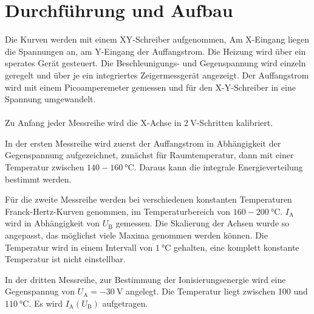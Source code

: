\section{Durchführung und Aufbau}
\label{sec:Aufbau}
Die Kurven werden mit einem XY-Schreiber aufgenommen,
Am X-Eingang liegen die Spannungen an, am Y-Eingang der Auffangstrom.
Die Heizung wird über ein sperates Gerät gesteuert.
Die Beschleunigungs- und Gegenspannung wird einzeln geregelt und über je ein
integriertes Zeigermessgerät angezeigt.
Der Auffangstrom wird mit einem Picoamperemeter gemessen und für
den X-Y-Schreiber in eine Spannung umgewandelt.
\\~\\
Zu Anfang jeder Messreihe wird die X-Achse in $\SI{2}{\volt}$-Schritten kalibriert.

In der ersten Messreihe wird zuerst der Auffangstrom in Abhängigkeit der
Gegenspannung aufgezeichnet, zunächst für Raumtemperatur,
dann mit einer Temperatur zwischen $\num{140} - \SI{160}{\celsius}$.
Daraus kann die integrale Energieverteilung bestimmt werden.

Für die zweite Messreihe werden bei verschiedenen konstanten Temperaturen Franck-Hertz-Kurven
genommen, im Temperaturbereich von $\num{160} - \SI{200}{\celsius}$.
$I_\text{A}$ wird in Abhängigkeit von $U_\text{B}$ gemessen.
Die Skalierung der Achsen wurde so angepasst, das möglichst viele Maxima
genommen werden können.
Die Temperatur wird in einem Intervall von $\SI{1}{\celsius}$ gehalten,
eine komplett konstante Temperatur ist nicht einstellbar.

In der dritten Messreihe, zur Bestimmung der Ionisierungsenergie wird eine
Gegenspannug von $U_\text{A} = \SI{-30}{\volt}$
angelegt. Die Temperatur liegt zwischen 100 und $\SI{110}{\celsius}$.
Es wird $I_\text{A}(U_\text{B})$ aufgetragen.
